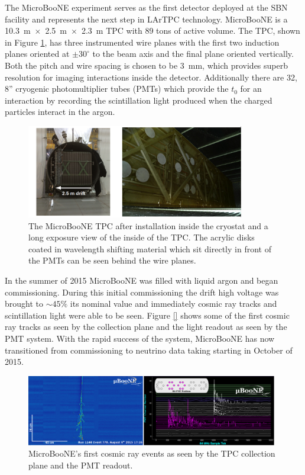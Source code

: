 
The MicroBooNE experiment serves as the first detector deployed at the SBN facility and represents the next step in LArTPC technology. MicroBooNE is a 10.3~m~$\times$~2.5~m~$\times$~2.3~m TPC with 89 tons of active volume. The TPC, shown in Figure \ref{fig:uboone}, has three instrumented wire planes with the first two induction planes oriented at $\pm 30^{\circ}$ to the beam axis and the final plane oriented vertically. Both the pitch and wire spacing is chosen to be 3~mm, which provides superb resolution for imaging interactions inside the detector. Additionally there are 32, 8'' cryogenic photomultiplier tubes (PMTs) which provide the $t_{0}$ for an interaction by recording the scintillation light produced when the charged particles interact in the argon.

\begin{figure}[htb]
\centering
\includegraphics[width=0.85\textwidth]{images/microboone.png}
\caption[]{The MicroBooNE TPC after installation inside the cryostat and a long exposure view of the inside of the TPC. The acrylic disks coated in wavelength shifting material which sit directly in front of the PMTs can be seen behind the wire planes.}
\label{fig:uboone}
\end{figure}

In the summer of 2015 MicroBooNE was filled with liquid argon and began commissioning. During this initial commissioning the drift high voltage was brought to $\sim 45\%$ its nominal value and immediately cosmic ray tracks and scintillation light were able to be seen. Figure \ref{} shows some of the first cosmic ray tracks as seen by the collection plane and the light readout as seen by the PMT system. With the rapid success of the system, MicroBooNE has now transitioned from commissioning to neutrino data taking starting in October of 2015. 

\begin{figure}[htb]
\centering
\includegraphics[width=0.98\textwidth]{images/microbooneEvents.png}
\caption[]{MicroBooNE's first cosmic ray events as seen by the TPC collection plane and the PMT readout.}
\label{fig:ubooneEvents}
\end{figure}

